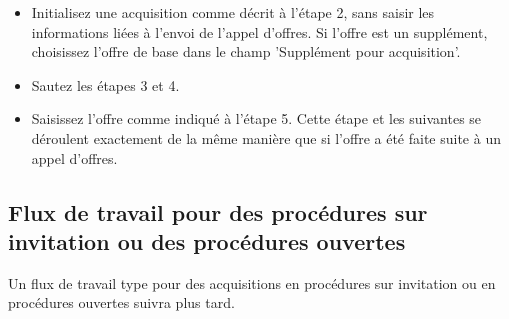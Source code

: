\begin{itemize}
\item
Initialisez une acquisition comme décrit à l'étape 2, sans saisir les informations liées à l'envoi de l'appel d'offres. Si l'offre est un supplément, choisissez l'offre de base dans le champ 'Supplément pour acquisition'.
\item
Sautez les étapes 3 et 4.
\item
Saisissez l'offre comme indiqué à l'étape 5. Cette étape et les suivantes se déroulent exactement de la même manière que si l'offre a été faite suite à un appel d'offres.
\end{itemize}

\subsection{Flux de travail pour des procédures sur invitation ou des procédures ouvertes}

Un flux de travail type pour des acquisitions en procédures sur invitation ou en procédures ouvertes suivra plus tard.


